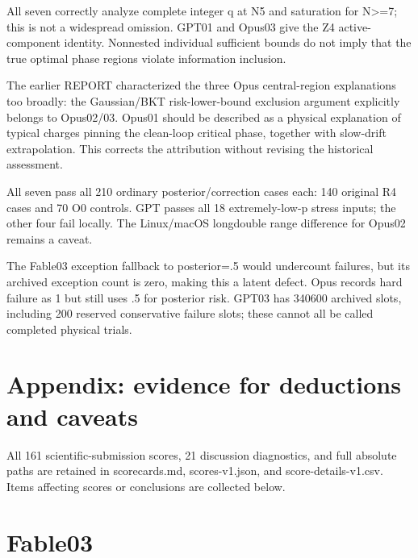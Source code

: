 \documentclass[11pt,a4paper]{article}
\begin{document}
All seven correctly analyze complete integer q at N5 and saturation for N>=7; this is not a widespread omission. GPT01 and Opus03 give the Z4 active-component identity. Nonnested individual sufficient bounds do not imply that the true optimal phase regions violate information inclusion.

The earlier REPORT characterized the three Opus central-region explanations too broadly: the Gaussian/\allowbreak{}BKT risk-lower-bound exclusion argument explicitly belongs to Opus02/\allowbreak{}03. Opus01 should be described as a physical explanation of typical charges pinning the clean-loop critical phase, together with slow-drift extrapolation. This corrects the attribution without revising the historical assessment.

All seven pass all 210 ordinary posterior/\allowbreak{}correction cases each: 140 original R4 cases and 70 O0 controls. GPT passes all 18 extremely-low-p stress inputs; the other four fail locally. The Linux/\allowbreak{}macOS longdouble range difference for Opus02 remains a caveat.

The Fable03 exception fallback to posterior=.5 would undercount failures, but its archived exception count is zero, making this a latent defect. Opus records hard failure as 1 but still uses .5 for posterior risk. GPT03 has 340600 archived slots, including 200 reserved conservative failure slots; these cannot all be called completed physical trials.

\section*{Appendix: evidence for deductions and caveats}

All 161 scientific-submission scores, 21 discussion diagnostics, and full absolute paths are retained in scorecards.md, scores-v1.json, and score-details-v1.csv. Items affecting scores or conclusions are collected below.

\section*{Fable03}
\end{document}
